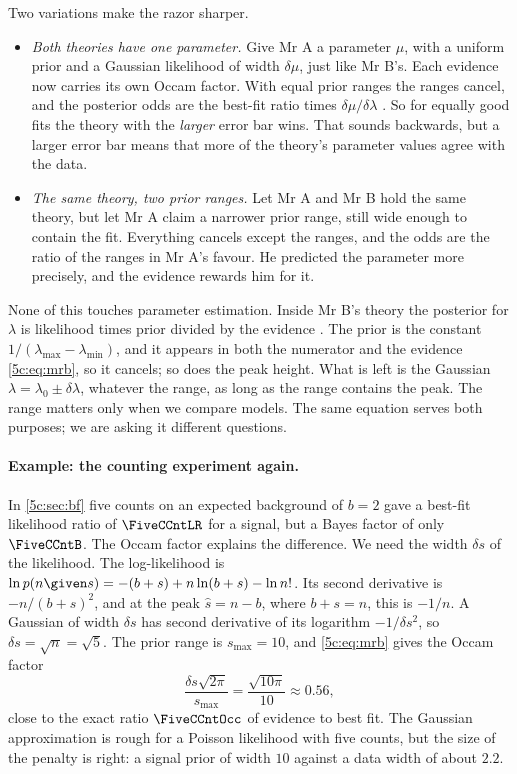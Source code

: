 Two variations make the razor sharper.
\begin{itemize}[itemsep=1pt,leftmargin=1.2em]
  \item \emph{Both theories have one parameter.} Give Mr A a parameter $\mu$, with a
        uniform prior and a Gaussian likelihood of width $\delta\mu$, just like Mr B's.
        Each evidence now carries its own Occam factor. With equal prior ranges the
        ranges cancel, and the posterior odds are the best-fit ratio times
        $\delta\mu/\delta\lambda$ . So for equally good fits the
        theory with the \emph{larger} error bar wins. That sounds backwards, but a
        larger error bar means that more of the theory's parameter values agree with
        the data.
  \item \emph{The same theory, two prior ranges.} Let Mr A and Mr B hold the same
        theory, but let Mr A claim a narrower prior range, still wide enough to
        contain the fit. Everything cancels except the ranges, and the odds are the
        ratio of the ranges in Mr A's favour. He predicted the parameter more
        precisely, and the evidence rewards him for it.
\end{itemize}

None of this touches parameter estimation. Inside Mr B's theory the posterior for
$\lambda$ is likelihood times prior divided by the evidence .
The prior is the constant $1/(\lambda_{\max}-\lambda_{\min})$, and it appears in both
the numerator and the evidence \eqref{5c:eq:mrb}, so it cancels; so does the peak
height. What is left is the Gaussian $\lambda=\lambda_0\pm\delta\lambda$, whatever the
range, as long as the range contains the peak. The range matters only when we compare
models. The same equation serves both purposes; we are asking it different questions.

\paragraph{Example: the counting experiment again.}
In \cref{5c:sec:bf} five counts on an expected background of $b=2$ gave a best-fit
likelihood ratio of $\FiveCCntLR$ for a signal, but a Bayes factor of only
$\FiveCCntB$. The Occam factor explains the difference. We need the width $\delta s$ of
the likelihood. The log-likelihood is $\ln p(n\given s)=-(b+s)+n\ln(b+s)-\ln n!$. Its
second derivative is $-n/(b+s)^2$, and at the peak $\hat s=n-b$, where $b+s=n$, this
is $-1/n$. A Gaussian of width $\delta s$ has second derivative of its logarithm
$-1/\delta s^2$, so $\delta s=\sqrt n=\sqrt5$. The prior range is $s_{\max}=10$, and
\eqref{5c:eq:mrb} gives the Occam factor
\[
  \frac{\delta s\sqrt{2\pi}}{s_{\max}}=\frac{\sqrt{10\pi}}{10}\approx0.56 ,
\]
close to the exact ratio $\FiveCCntOcc$ of evidence to best fit. The Gaussian
approximation is rough for a Poisson likelihood with five counts, but the size of the
penalty is right: a signal prior of width $10$ against a data width of about $2.2$.

